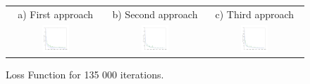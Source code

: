 \begin{figure}[htb]
\centering
\begin{tabular}{ccc}
    a) First approach & b) Second approach & c) Third approach \\
    \includegraphics[width=0.3\textwidth]{images/regression/test_loss_26_135000}&
    \includegraphics[width=0.3\textwidth]{images/regression/test_loss_37_135000}&
    \includegraphics[width=0.3\textwidth]{images/regression/test_loss_30_135000}\\
\end{tabular}
\caption{Loss Function for 135 000 iterations.}
\label{1apploss}
\label{2apploss}
\label{3apploss}
\end{figure}

